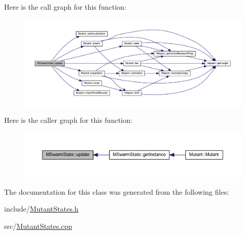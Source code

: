 Here is the call graph for this function\+:
\nopagebreak
\begin{figure}[H]
\begin{center}
\leavevmode
\includegraphics[width=350pt]{class_m_swarm_state_a7e4abd7da613e0a3d013e149c37f8e40_cgraph}
\end{center}
\end{figure}
Here is the caller graph for this function\+:
\nopagebreak
\begin{figure}[H]
\begin{center}
\leavevmode
\includegraphics[width=350pt]{class_m_swarm_state_a7e4abd7da613e0a3d013e149c37f8e40_icgraph}
\end{center}
\end{figure}


The documentation for this class was generated from the following files\+:\begin{DoxyCompactItemize}
\item 
include/\hyperlink{_mutant_states_8h}{Mutant\+States.\+h}\item 
src/\hyperlink{_mutant_states_8cpp}{Mutant\+States.\+cpp}\end{DoxyCompactItemize}
